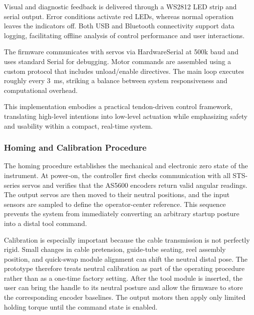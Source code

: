 Visual and diagnostic feedback is delivered through a WS2812 LED strip and serial output. Error conditions activate red LEDs, whereas normal operation leaves the indicators off. Both USB and Bluetooth connectivity support data logging, facilitating offline analysis of control performance and user interactions.

The firmware communicates with servos via HardwareSerial at 500k baud and uses standard Serial for debugging. Motor commands are assembled using a custom protocol that includes unload/enable directives. The main loop executes roughly every 3~ms, striking a balance between system responsiveness and computational overhead.

This implementation embodies a practical tendon-driven control framework, translating high-level intentions into low-level actuation while emphasizing safety and usability within a compact, real-time system.

\subsubsection{Homing and Calibration Procedure}
The homing procedure establishes the mechanical and electronic zero state of the instrument. At power-on, the controller first checks communication with all STS-series servos and verifies that the AS5600 encoders return valid angular readings. The output servos are then moved to their neutral positions, and the input sensors are sampled to define the operator-center reference. This sequence prevents the system from immediately converting an arbitrary startup posture into a distal tool command.

Calibration is especially important because the cable transmission is not perfectly rigid. Small changes in cable pretension, guide-tube seating, reel assembly position, and quick-swap module alignment can shift the neutral distal pose. The prototype therefore treats neutral calibration as part of the operating procedure rather than as a one-time factory setting. After the tool module is inserted, the user can bring the handle to its neutral posture and allow the firmware to store the corresponding encoder baselines. The output motors then apply only limited holding torque until the command state is enabled.

